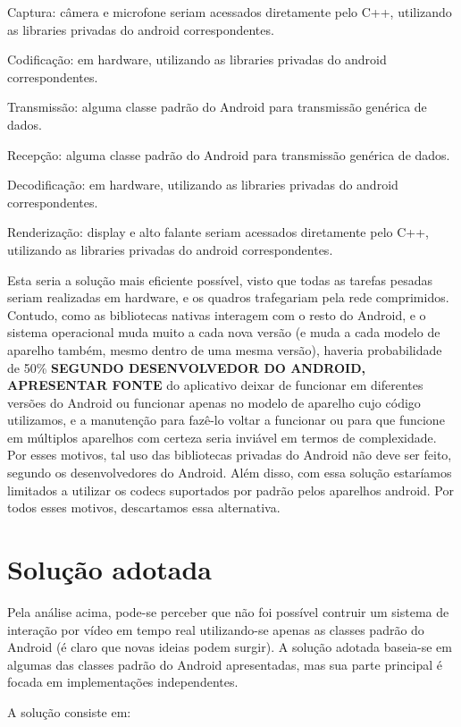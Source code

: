 \documentclass{acm_proc_article-sp}
\newcommand{\todo}[1]{\textcolor[rgb]{1.00,0.00,0.00}{\bf \uppercase{#1}}}
\begin{document}
Captura: câmera e microfone seriam acessados diretamente pelo C++, utilizando as libraries privadas do android correspondentes.

Codificação: em hardware, utilizando as libraries privadas do android correspondentes.

Transmissão: alguma classe padrão do Android para transmissão genérica de dados.

Recepção: alguma classe padrão do Android para transmissão genérica de dados.

Decodificação: em hardware, utilizando as libraries privadas do android correspondentes.

Renderização: display e alto falante seriam acessados diretamente pelo C++, utilizando as libraries privadas do android correspondentes.

Esta seria a solução mais eficiente possível, visto que todas as tarefas pesadas seriam realizadas em hardware, e os quadros trafegariam pela rede comprimidos. Contudo, como as bibliotecas nativas interagem com o resto do Android, e o sistema operacional muda muito a cada nova versão (e muda a cada modelo de aparelho também, mesmo dentro de uma mesma versão), haveria probabilidade de 50\% \todo{segundo desenvolvedor do android, apresentar fonte} do aplicativo deixar de funcionar em diferentes versões do Android ou funcionar apenas no modelo de aparelho cujo código utilizamos, e a manutenção para fazê-lo voltar a funcionar ou para que funcione em múltiplos aparelhos com certeza seria inviável em termos de complexidade. Por esses motivos, tal uso das bibliotecas privadas do Android não deve ser feito, segundo os desenvolvedores do Android. Além disso, com essa solução estaríamos limitados a utilizar os codecs suportados por padrão pelos aparelhos android. Por todos esses motivos, descartamos essa alternativa.

\section{Solução adotada}

Pela análise acima, pode-se perceber que não foi possível contruir um sistema de interação por vídeo em tempo real utilizando-se apenas as classes padrão do Android (é claro que novas ideias podem surgir). A solução adotada baseia-se em algumas das classes padrão do Android apresentadas, mas sua parte principal é focada em implementações independentes.

A solução consiste em:
\end{document}

